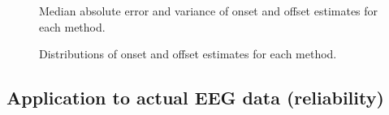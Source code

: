 \documentclass[
  doc,
  floatsintext,
  longtable,
  a4paper,
  nolmodern,
  notxfonts,
  notimes,
  colorlinks=true,linkcolor=blue,citecolor=blue,urlcolor=blue]{apa7}
\begin{document}
\begin{figure}[!htb]

\caption{\label{fig-simulation-mae-variance}Median absolute error and
variance of onset and offset estimates for each method.}


\end{figure}%

\begin{figure}[!htb]

\caption{\label{fig-simulation-distribution}Distributions of onset and
offset estimates for each method.}


\end{figure}%

\subsection{Application to actual EEG data
(reliability)}\label{application-to-actual-eeg-data-reliability}
\end{document}
